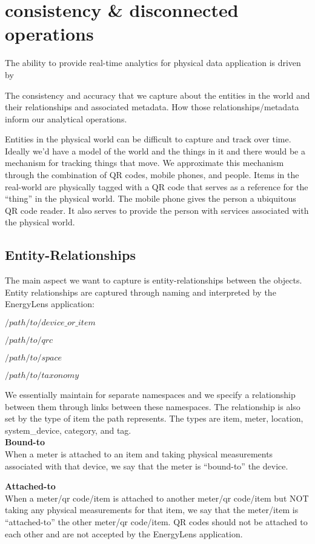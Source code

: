 \section{consistency \& disconnected operations}

The ability to provide real-time analytics for physical data application is driven by 

The consistency and accuracy that we capture about the entities in the world and their relationships and associated metadata.
How those relationships/metadata inform our analytical operations.

Entities in the physical world can be difficult to capture and track over time.  Ideally we’d have a model of the world and the things in it and there would be a mechanism for tracking things that move.  We approximate this mechanism through the combination of QR codes, mobile phones, and people.  Items in the real-world are physically tagged with a QR code that serves as a reference for the “thing” in the physical world.  The mobile phone gives the person a ubiquitous QR code reader.  It also serves to provide the person with services associated with the physical world.

\subsection{Entity-Relationships}
The main aspect we want to capture is entity-relationships between the objects.  Entity relationships are captured through naming and interpreted by the EnergyLens application:

$/path/to/device\_or\_item$

$/path/to/qrc$

$/path/to/space$

$/path/to/taxonomy$

We essentially maintain for separate namespaces and we specify a relationship between them through links between these namespaces.  The relationship is also set by the type of item the path represents.  The types are item, meter, location, system\_device, category, and tag.\\

{\bf Bound-to}\\
When a meter is attached to an item and taking physical measurements associated with that device, we say that the meter is “bound-to” the device.

{\bf Attached-to}\\
When a meter/qr code/item is attached to another meter/qr code/item but NOT taking any physical measurements for that item, we say that the meter/item is “attached-to” the other meter/qr code/item.  QR codes should not be attached to each other and are not accepted by the EnergyLens application.

